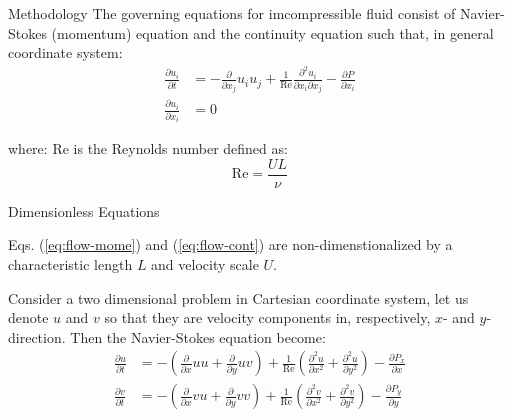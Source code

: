 \documentclass{beamer}
\newcommand{\ren}{ \text{Re} }
\begin{document}
\begin{frame}{Methodology}
	The governing equations for imcompressible fluid consist of Navier-Stokes (momentum) equation and the continuity equation such that, in general coordinate system: \begin{align}
		\frac{\partial u_i}{\partial t} &= -\frac{\partial }{\partial x_j} u_i u_j + \frac{1}{\ren} \frac{\partial^2 u_i}{\partial x_i \partial x_j} - \frac{\partial P}{\partial x_i} \label{eq:flow-mome} \\
		\frac{\partial u_i}{\partial x_i} &= 0 \label{eq:flow-cont}
	\end{align}
	
	where: $\text{Re}$ is the Reynolds number defined as:
	\begin{equation}
		\text{Re} = \frac{UL}{\nu}
	\end{equation}
	
	\begin{block}{Dimensionless Equations}
		\begin{center}
			Eqs. (\ref{eq:flow-mome}) and (\ref{eq:flow-cont}) are non-dimenstionalized by a characteristic length $L$ and velocity scale $U$.
		\end{center}
	\end{block}
	
	\framebreak
	
	Consider a two dimensional problem in Cartesian coordinate system, let us denote $u$ and $v$ so that they are velocity components in, respectively, $x$- and $y$-direction. Then the Navier-Stokes equation become: 
	\begin{align}
		\frac{\partial u}{\partial t} &= - \left( \frac{\partial }{\partial x} u u + \frac{\partial }{\partial y} u v \right) + \frac{1}{\ren} \left( \frac{\partial^2 u}{\partial x^2} + \frac{\partial^2 u}{\partial y^2} \right) - \frac{\partial P_x}{\partial x} \\
		\frac{\partial v}{\partial t} &= - \left( \frac{\partial }{\partial x} v u + \frac{\partial }{\partial y} v v \right) + \frac{1}{\ren} \left( \frac{\partial^2 v}{\partial x^2} + \frac{\partial^2 v}{\partial y^2} \right) - \frac{\partial P_y}{\partial y}
	\end{align}
	

\end{frame}
\end{document}
